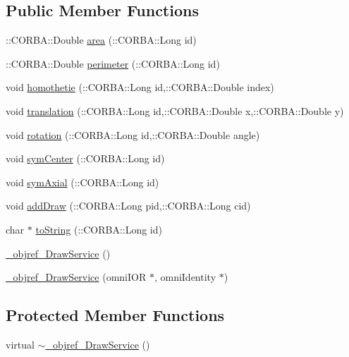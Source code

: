 \subsection*{Public Member Functions}
\begin{DoxyCompactItemize}
\item 
\+::C\+O\+R\+B\+A\+::\+Double \hyperlink{class__objref___draw_service_a2c3483f409eb3a6a7f8e810e83c33f84}{area} (\+::C\+O\+R\+B\+A\+::\+Long id)
\item 
\+::C\+O\+R\+B\+A\+::\+Double \hyperlink{class__objref___draw_service_afdb653b8fcf7e10a1c3e3953bef0fdd5}{perimeter} (\+::C\+O\+R\+B\+A\+::\+Long id)
\item 
void \hyperlink{class__objref___draw_service_a9994197fccedfac8edc3e23d2209a227}{homothetie} (\+::C\+O\+R\+B\+A\+::\+Long id,\+::C\+O\+R\+B\+A\+::\+Double index)
\item 
void \hyperlink{class__objref___draw_service_a071c62572390b6d20615afdce21adec4}{translation} (\+::C\+O\+R\+B\+A\+::\+Long id,\+::C\+O\+R\+B\+A\+::\+Double x,\+::C\+O\+R\+B\+A\+::\+Double y)
\item 
void \hyperlink{class__objref___draw_service_a1780564038d80177fe9edbcc6667bc1e}{rotation} (\+::C\+O\+R\+B\+A\+::\+Long id,\+::C\+O\+R\+B\+A\+::\+Double angle)
\item 
void \hyperlink{class__objref___draw_service_adbeccf72a76c7584277919e736f7bec2}{sym\+Center} (\+::C\+O\+R\+B\+A\+::\+Long id)
\item 
void \hyperlink{class__objref___draw_service_aa515f8f0c6b6e07e4609f03efb12aa7e}{sym\+Axial} (\+::C\+O\+R\+B\+A\+::\+Long id)
\item 
void \hyperlink{class__objref___draw_service_a1fa9bba40ebcc7726f2fc54fe21719d2}{add\+Draw} (\+::C\+O\+R\+B\+A\+::\+Long pid,\+::C\+O\+R\+B\+A\+::\+Long cid)
\item 
char $\ast$ \hyperlink{class__objref___draw_service_a8fc2d537f125bf90fd1c620e38efb251}{to\+String} (\+::C\+O\+R\+B\+A\+::\+Long id)
\item 
\hyperlink{class__objref___draw_service_aa60d7ece4d50a924e20ea7354e622ddb}{\+\_\+objref\+\_\+\+Draw\+Service} ()
\item 
\hyperlink{class__objref___draw_service_af87c58cc0e9437d7bed172134bf91567}{\+\_\+objref\+\_\+\+Draw\+Service} (omni\+I\+OR $\ast$, omni\+Identity $\ast$)
\end{DoxyCompactItemize}
\subsection*{Protected Member Functions}
\begin{DoxyCompactItemize}
\item 
virtual \hyperlink{class__objref___draw_service_a8f59efe7fc23282519e703262482cec6}{$\sim$\+\_\+objref\+\_\+\+Draw\+Service} ()
\end{DoxyCompactItemize}
